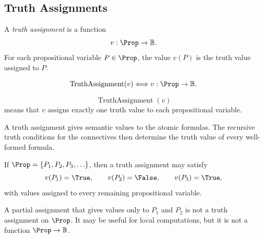 \subsection*{Truth Assignments}
\label{subsec:truth-assignments-propositional-logic}

\begin{tcolorbox}[colback=propbox, colframe=propborder, arc=2pt,
  left=6pt, right=6pt, top=4pt, bottom=4pt,
  title={\small\textbf{Definition (Truth Assignment)}},
  fonttitle=\small\bfseries]
\begin{definition}
\label{def:truth-assignment-propositional-logic}
A \emph{truth assignment} is a function
\[
v:\Prop\to\mathbb{B}.
\]
For each propositional variable \(P\in\Prop\), the value \(v(P)\) is the truth
value assigned to \(P\).
\end{definition}
\end{tcolorbox}

\begin{remark*}
\[
\operatorname{TruthAssignment}(v)
\Longleftrightarrow
v:\Prop\to\mathbb{B}.
\]
\end{remark*}

\begin{remark*}
\[
\operatorname{TruthAssignment}(v)
\]
means that \(v\) assigns exactly one truth value to each propositional variable.
\end{remark*}

\begin{remark*}[Interpretation]
A truth assignment gives semantic values to the atomic formulas. The recursive
truth conditions for the connectives then determine the truth value of every
well-formed formula.
\end{remark*}

\begin{remark*}[Examples]
If \(\Prop=\{P_1,P_2,P_3,\ldots\}\), then a truth assignment may satisfy
\[
v(P_1)=\True,\qquad v(P_2)=\False,\qquad v(P_3)=\True,
\]
with values assigned to every remaining propositional variable.
\end{remark*}

\begin{remark*}
A partial assignment that gives values only to \(P_1\) and \(P_2\) is not a truth
assignment on \(\Prop\). It may be useful for local computations, but it is not a
function \(\Prop\to\mathbb{B}\).
\end{remark*}

